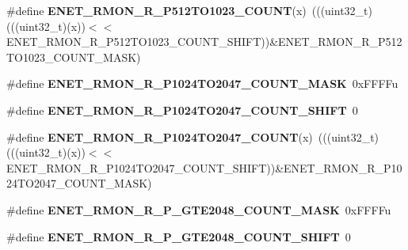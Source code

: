 \begin{DoxyCompactItemize}
\item 
\#define {\bfseries E\+N\+E\+T\+\_\+\+R\+M\+O\+N\+\_\+\+R\+\_\+\+P512\+T\+O1023\+\_\+\+C\+O\+U\+NT}(x)~(((uint32\+\_\+t)(((uint32\+\_\+t)(x))$<$$<$E\+N\+E\+T\+\_\+\+R\+M\+O\+N\+\_\+\+R\+\_\+\+P512\+T\+O1023\+\_\+\+C\+O\+U\+N\+T\+\_\+\+S\+H\+I\+FT))\&E\+N\+E\+T\+\_\+\+R\+M\+O\+N\+\_\+\+R\+\_\+\+P512\+T\+O1023\+\_\+\+C\+O\+U\+N\+T\+\_\+\+M\+A\+SK)\hypertarget{group__ENET__Register__Masks_ga116549b0b0b2c1813d9ffc1f6657a07d}{}\label{group__ENET__Register__Masks_ga116549b0b0b2c1813d9ffc1f6657a07d}

\item 
\#define {\bfseries E\+N\+E\+T\+\_\+\+R\+M\+O\+N\+\_\+\+R\+\_\+\+P1024\+T\+O2047\+\_\+\+C\+O\+U\+N\+T\+\_\+\+M\+A\+SK}~0x\+F\+F\+F\+Fu\hypertarget{group__ENET__Register__Masks_ga9e6dbfdcd74c5b14ff7987973c952753}{}\label{group__ENET__Register__Masks_ga9e6dbfdcd74c5b14ff7987973c952753}

\item 
\#define {\bfseries E\+N\+E\+T\+\_\+\+R\+M\+O\+N\+\_\+\+R\+\_\+\+P1024\+T\+O2047\+\_\+\+C\+O\+U\+N\+T\+\_\+\+S\+H\+I\+FT}~0\hypertarget{group__ENET__Register__Masks_gacf33c89b25640b4d44a0cc1a7e8ee178}{}\label{group__ENET__Register__Masks_gacf33c89b25640b4d44a0cc1a7e8ee178}

\item 
\#define {\bfseries E\+N\+E\+T\+\_\+\+R\+M\+O\+N\+\_\+\+R\+\_\+\+P1024\+T\+O2047\+\_\+\+C\+O\+U\+NT}(x)~(((uint32\+\_\+t)(((uint32\+\_\+t)(x))$<$$<$E\+N\+E\+T\+\_\+\+R\+M\+O\+N\+\_\+\+R\+\_\+\+P1024\+T\+O2047\+\_\+\+C\+O\+U\+N\+T\+\_\+\+S\+H\+I\+FT))\&E\+N\+E\+T\+\_\+\+R\+M\+O\+N\+\_\+\+R\+\_\+\+P1024\+T\+O2047\+\_\+\+C\+O\+U\+N\+T\+\_\+\+M\+A\+SK)\hypertarget{group__ENET__Register__Masks_ga48a1c9b8f8ca8200a90af7f0b7948e27}{}\label{group__ENET__Register__Masks_ga48a1c9b8f8ca8200a90af7f0b7948e27}

\item 
\#define {\bfseries E\+N\+E\+T\+\_\+\+R\+M\+O\+N\+\_\+\+R\+\_\+\+P\+\_\+\+G\+T\+E2048\+\_\+\+C\+O\+U\+N\+T\+\_\+\+M\+A\+SK}~0x\+F\+F\+F\+Fu\hypertarget{group__ENET__Register__Masks_gaf5df4a669f61146ee44ed2f49360b952}{}\label{group__ENET__Register__Masks_gaf5df4a669f61146ee44ed2f49360b952}

\item 
\#define {\bfseries E\+N\+E\+T\+\_\+\+R\+M\+O\+N\+\_\+\+R\+\_\+\+P\+\_\+\+G\+T\+E2048\+\_\+\+C\+O\+U\+N\+T\+\_\+\+S\+H\+I\+FT}~0\hypertarget{group__ENET__Register__Masks_ga904cd13cbfecbb28ad3eb52c05fd3df0}{}\label{group__ENET__Register__Masks_ga904cd13cbfecbb28ad3eb52c05fd3df0}


\end{DoxyCompactItemize}
